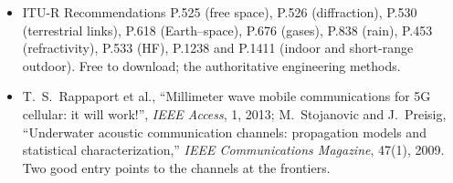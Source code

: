 \begin{itemize}
Annex B (LTE fading models). The models used to design and test 5G and LTE.
\item ITU-R Recommendations P.525 (free space), P.526 (diffraction), P.530 (terrestrial links),
P.618 (Earth--space), P.676 (gases), P.838 (rain), P.453 (refractivity), P.533 (HF), P.1238 and
P.1411 (indoor and short-range outdoor). Free to download; the authoritative engineering methods.
\item T.~S.~Rappaport et al., ``Millimeter wave mobile communications for 5G cellular: it will
work!'', \emph{IEEE Access}, 1, 2013; M.~Stojanovic and J.~Preisig, ``Underwater acoustic
communication channels: propagation models and statistical characterization,'' \emph{IEEE
Communications Magazine}, 47(1), 2009. Two good entry points to the channels at the frontiers.
\end{itemize}
